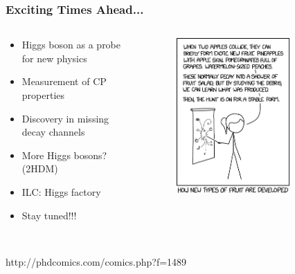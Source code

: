 \documentclass[xcolor={usenames,dvipsnames,svgnames,table}]{beamer}
\begin{document}
\begin{frame}
	\frametitle{Exciting Times Ahead...}
	\begin{columns}
	\begin{column}{0.49\textwidth}
	\begin{itemize}
		\item Higgs boson as a probe for new physics
		\item Measurement of CP properties
		\item Discovery in missing decay channels
		\item More Higgs bosons? (2HDM)
		\item ILC: Higgs factory
		\item Stay tuned!!!
	\end{itemize}
  \end{column}
  \begin{column}{0.49\textwidth}
	\begin{figure}[t]
		\includegraphics[width=0.75\textwidth]{plots/fruit_collider.png}
	\end{figure}
  \end{column}
\end{columns}
	\\
	\centering \textcolor{color1}{http://phdcomics.com/comics.php?f=1489}
\end{frame}
\end{document}
